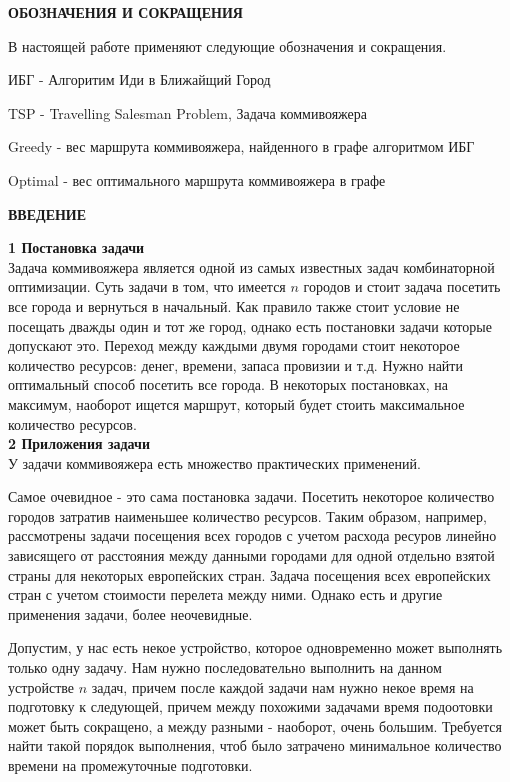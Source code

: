 \documentclass[a4paper, 14pt]{extarticle}
\begin{document}
\newpage

\begin{center}
 \textbf{ОБОЗНАЧЕНИЯ И СОКРАЩЕНИЯ}
\end{center}

В настоящей работе применяют следующие обозначения и сокращения.

ИБГ - Алгоритим Иди в Ближайщий Город

TSP - Travelling Salesman Problem, Задача коммивояжера

Greedy - вес маршрута коммивояжера, найденного в графе алгоритмом ИБГ

Optimal - вес оптимального маршрута коммивояжера в графе



\newpage

\begin{center}
 \textbf{ВВЕДЕНИЕ}
\end{center}

\textbf{1 Постановка задачи} \\


Задача коммивояжера является одной из самых известных задач комбинаторной оптимизации. Суть задачи в том, что имеется $n$ городов и стоит задача посетить все города и вернуться в начальный. Как правило также стоит условие не посещать дважды один и тот же город, однако есть постановки задачи которые допускают это. Переход между каждыми двумя городами стоит некоторое количество ресурсов: денег, времени, запаса провизии и т.д. Нужно найти оптимальный способ посетить все города. В некоторых постановках, на максимум, наоборот ищется маршрут, который будет стоить максимальное количество ресурсов. \\

\textbf{2 Приложения задачи} \\

У задачи коммивояжера есть множество практических применений. 

Самое очевидное - это сама постановка задачи. Посетить некоторое количество городов затратив наименьшее количество ресурсов. Таким образом, например, рассмотрены задачи посещения всех городов с учетом расхода ресуров линейно зависящего от расстояния между данными городами для одной отдельно взятой страны для некоторых европейских стран. Задача посещения всех европейских стран с учетом стоимости перелета между ними. Однако есть и другие применения задачи, более неочевидные.

Допустим, у нас есть некое устройство, которое одновременно может выполнять только одну задачу.  Нам нужно последовательно выполнить на данном устройстве $n$ задач, причем после каждой задачи нам нужно некое время на подготовку к следующей, причем между похожими задачами время подоотовки может быть сокращено, а между разными - наоборот, очень большим. Требуется найти такой порядок выполнения, чтоб было затрачено минимальное количество времени на промежуточные подготовки.
\end{document}
